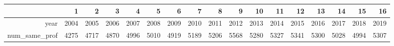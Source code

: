 \begin{table}[ht]
\centering
\begin{tabular}{rrrrrrrrrrrrrrrrr}
  \hline
 & 1 & 2 & 3 & 4 & 5 & 6 & 7 & 8 & 9 & 10 & 11 & 12 & 13 & 14 & 15 & 16 \\ 
  \hline
year & 2004 & 2005 & 2006 & 2007 & 2008 & 2009 & 2010 & 2011 & 2012 & 2013 & 2014 & 2015 & 2016 & 2017 & 2018 & 2019 \\ 
  num\_same\_prof & 4275 & 4717 & 4870 & 4996 & 5010 & 4919 & 5189 & 5206 & 5568 & 5280 & 5327 & 5341 & 5300 & 5028 & 4994 & 5307 \\ 
   \hline
\end{tabular}
\end{table}
